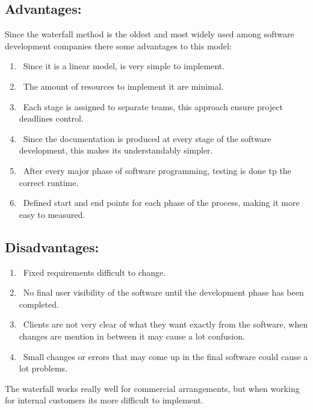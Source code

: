 \subsection*{Advantages:} Since the waterfall method is the oldest and most widely used among software development companies there some advantages to this model:
\begin{enumerate}
	\item\ Since it is a linear model, is very simple to implement.
	\item\ The amount of resources to implement it are minimal.
	\item\ Each stage is assigned to separate teams, this approach ensure project deadlines control.
	\item\ Since the documentation is produced at every stage of the software development, this makes its understandably simpler.
	\item\ After every major phase of software programming, testing is done tp the correct runtime.
	\item\ Defined start and end points for each phase of the process, making it more easy to measured. 
\end{enumerate}

\subsection*{Disadvantages:} 
\begin{enumerate}
	\item\ Fixed requirements difficult to change.
	\item\ No final user visibility of the software until the development phase has been completed.
	\item\ Clients are not very clear of what they want exactly from the software, when changes are mention in between it may cause a lot confusion.
	\item\ Small changes or errors that may come up in the final software could cause a lot problems.
\end{enumerate}

The waterfall works really well for commercial arrangements, but when working for internal customers its more difficult to implement.



